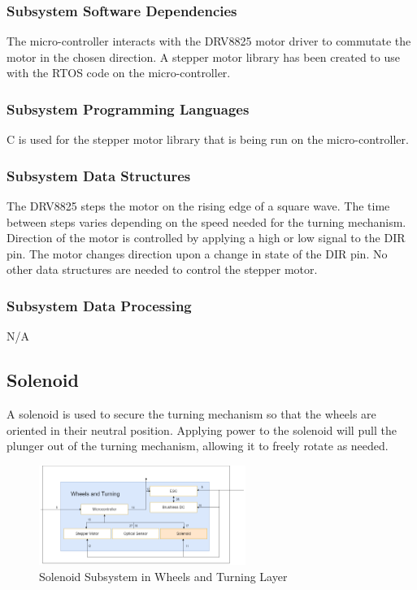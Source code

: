 \subsubsection{Subsystem Software Dependencies}
The micro-controller interacts with the DRV8825 motor driver to commutate the motor in the chosen direction. A stepper motor library has been created to use with the RTOS code on the micro-controller.

\subsubsection{Subsystem Programming Languages}
C is used for the stepper motor library that is being run on the micro-controller.

\subsubsection{Subsystem Data Structures}
The DRV8825 steps the motor on the rising edge of a square wave. The time between steps varies depending on the speed needed for the turning mechanism. Direction of the motor is controlled by applying a high or low signal to the DIR pin. The motor changes direction upon a change in state of the DIR pin. No other data structures are needed to control the stepper motor.

\subsubsection{Subsystem Data Processing}
N/A

\subsection{Solenoid}
A solenoid is used to secure the turning mechanism so that the wheels are oriented in their neutral position. Applying power to the solenoid will pull the plunger out of the turning mechanism, allowing it to freely rotate as needed.

\begin{figure}[h!]
	\centering
 	\includegraphics[width=0.60\textwidth]{images/Keaton/Solenoid.png}
 \caption{Solenoid Subsystem in Wheels and Turning Layer}
\end{figure}

